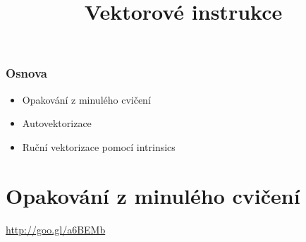 \documentclass[usenames,dvipsnames,9pt]{beamer}
\title{Vektorové instrukce}
\date{}
\institute{B4B36PDV -- Paralelní a distribuované výpočty}
\begin{document}
\maketitle

\begin{frame}
  \frametitle{Osnova}
  \begin{itemize}
    \item Opakování z minulého cvičení\\[1.5em]
    \item Autovektorizace
    \item Ruční vektorizace pomocí intrinsics\\[1.5em]
  \end{itemize}
\end{frame}


\section{Opakování z minulého cvičení}

\begin{frame}[standout]
  \Huge
  \url{http://goo.gl/a6BEMb}
\end{frame}
\end{document}
